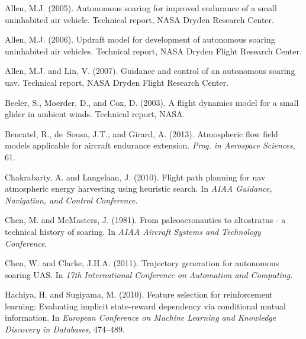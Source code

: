 \documentclass[a4paper, 10pt, conference]{ieeeconf}
\begin{document}
\begin{thebibliography}{99}

Allen, M.J. (2005).
\newblock Autonomous soaring for improved endurance of a small uninhabited air vehicle.
\newblock Technical report, NASA Dryden Research Center.

Allen, M.J. (2006).
\newblock Updraft model for development of autonomous soaring uninhabited air vehicles.
\newblock Technical report, NASA Dryden Flight Research Center.

Allen, M.J. and Lin, V. (2007).
\newblock Guidance and control of an autonomous soaring uav.
\newblock Technical report, NASA Dryden Flight Research Center.

Beeler, S., Moerder, D., and Cox, D. (2003).
\newblock A flight dynamics model for a small glider in ambient winds.
\newblock Technical report, NASA.

Bencatel, R., de~Sousa, J.T., and Girard, A. (2013).
\newblock Atmospheric flow field models applicable for aircraft endurance extension.
\newblock \emph{Prog. in Aerospace Sciences}, 61.

Chakrabarty, A. and Langelaan, J. (2010).
\newblock Flight path planning for uav atmospheric energy harvesting using heuristic search.
\newblock In \emph{AIAA Guidance, Navigation, and Control Conference}.

Chen, M. and McMasters, J. (1981).
\newblock From paleoaeronautics to altostratus - a technical history of soaring.
\newblock In \emph{AIAA Aircraft Systems and Technology Conference}.

Chen, W. and Clarke, J.H.A. (2011).
\newblock Trajectory generation for autonomous soaring {UAS}.
\newblock In \emph{17th International Conference on Automation and Computing}.

Hachiya, H. and Sugiyama, M. (2010).
\newblock Feature selection for reinforcement learning: Evaluating implicit state-reward dependency via conditional mutual information.
\newblock In \emph{European Conference on Machine Learning and Knowledge Discovery in Databases}, 474--489.


\end{thebibliography}
\end{document}
